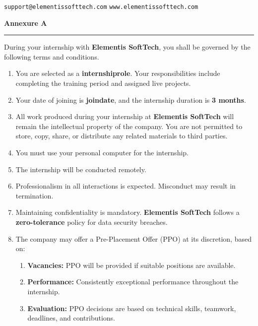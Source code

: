 \documentclass[a4paper,12pt]{article}
\begin{document}
\vspace{0.5cm}
\noindent
\texttt{support@elementissofttech.com} \hfill \texttt{www.elementissofttech.com}

\newpage

\begin{center}
    {\LARGE \textbf{Annexure A}} \\[0.3cm]
    \rule{\textwidth}{1pt}
\end{center}

\noindent
During your internship with \textbf{Elementis SoftTech}, you shall be governed by the following terms and conditions.

\vspace{0.5cm}
\begin{enumerate}[wide, label=\arabic*., labelindent=0pt]
    \item You are selected as a \textbf{internshiprole}. Your responsibilities include completing the training period and assigned live projects.

    \item Your date of joining is \textbf{joindate}, and the internship duration is \textbf{3 months}.

    \item All work produced during your internship at \textbf{Elementis SoftTech} will remain the intellectual property of the company. You are not permitted to store, copy, share, or distribute any related materials to third parties.

    \item You must use your personal computer for the internship.

    \item The internship will be conducted remotely.

    \item Professionalism in all interactions is expected. Misconduct may result in termination.

    \item Maintaining confidentiality is mandatory. \textbf{Elementis SoftTech} follows a \textbf{zero-tolerance} policy for data security breaches.

    \item The company may offer a Pre-Placement Offer (PPO) at its discretion, based on:
    \begin{enumerate}[label=\alph*.]
        \item \textbf{Vacancies:} PPO will be provided if suitable positions are available.
        \item \textbf{Performance:} Consistently exceptional performance throughout the internship.
        \item \textbf{Evaluation:} PPO decisions are based on technical skills, teamwork, deadlines, and contributions.
    \end{enumerate}
\end{enumerate}
\end{document}
